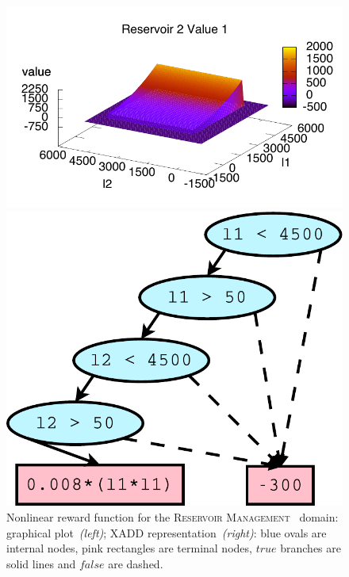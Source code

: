 \documentclass[letterpaper]{article}
\newcommand{\Reservoir}{\textsc{Reservoir Management}}
\begin{document}
\begin{figure}[t!]
\begin{minipage}{0.25\textwidth}
\center
\includegraphics[width=\textwidth, height=0.8\textwidth]{figures/reservoir2Value1/reservoir2Value1.pdf} 
\end{minipage}
\begin{minipage}{0.20\textwidth}
\center
\includegraphics[width=\textwidth, height=0.8\textwidth]{figures/reservoir2Value1/reservoir2Value1DD.pdf}
\end{minipage}
\caption{\small Nonlinear reward function for the \Reservoir~ domain: graphical plot~\emph{(left)}; XADD representation~\emph{(right)}: blue ovals are internal nodes, pink rectangles are terminal nodes, $true$ branches are solid lines and $false$ are dashed.}
\label{fig:exampleDD}
\end{figure}
\end{document}
